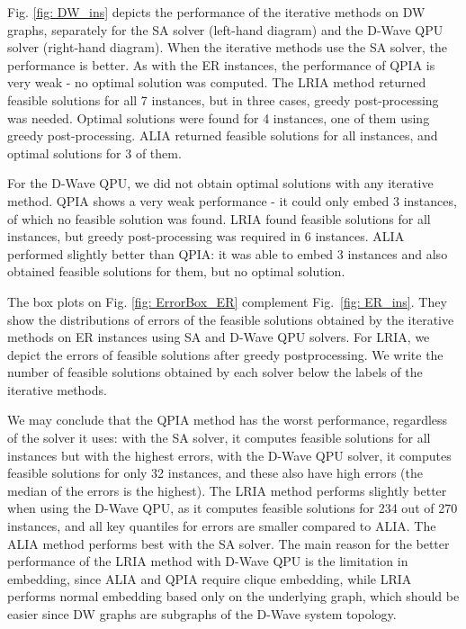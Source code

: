 \documentclass{article}
\begin{document}
Fig. \ref{fig: DW_ins} depicts the performance of the iterative methods on DW graphs, separately for the SA solver (left-hand diagram) and the D-Wave QPU solver (right-hand diagram).
When the iterative methods use the SA solver, the performance is better. As with the ER instances, the performance of QPIA is very weak - no optimal solution was computed. The LRIA method returned feasible solutions for all 7 instances, but in three cases, greedy post-processing was needed. Optimal solutions were found for 4 instances, one of them using greedy post-processing.
ALIA returned feasible solutions for all instances, and optimal solutions for 3 of them.

For the D-Wave QPU, we did not obtain optimal solutions with any iterative method. QPIA shows a very weak performance - it could only embed 3 instances, of which no feasible solution was found. LRIA found feasible solutions for all instances, but greedy post-processing was required in 6 instances. ALIA performed slightly better than QPIA: it was able to embed 3 instances and also obtained feasible solutions for them, but no optimal solution.


The box plots on Fig. \ref{fig: ErrorBox_ER} complement Fig.~\ref{fig: ER_ins}. They show the distributions of errors of the feasible solutions obtained by the iterative methods on  ER  instances using SA and D-Wave QPU solvers. For LRIA, we depict the errors of feasible solutions after greedy postprocessing. We write the number of feasible solutions obtained by each solver below the labels of the iterative methods. 


We may conclude that the QPIA method has the worst performance, regardless of the solver it uses: with the SA solver, it computes feasible solutions for all instances but with the highest errors, with the D-Wave QPU solver, it computes feasible solutions for only 32 instances, and these also have high errors (the median of the errors is the highest).
 The LRIA method performs slightly better when using the D-Wave QPU, as it computes feasible solutions for 234 out of 270 instances, and all key quantiles for errors are smaller compared to ALIA.
 The ALIA method performs best with the SA solver.
 The main reason for the better performance of the LRIA method with D-Wave QPU is the limitation in embedding, since ALIA and QPIA require clique embedding, while LRIA performs normal embedding based only on the underlying graph, which should be easier since DW graphs are subgraphs of the D-Wave system topology.
\end{document}
